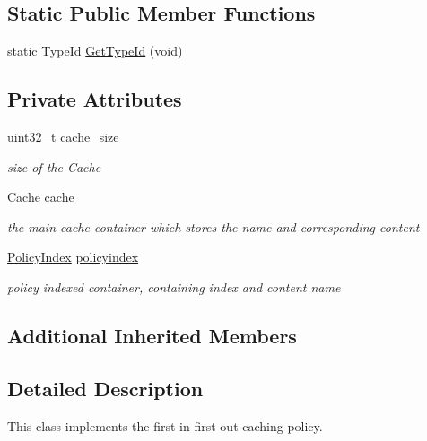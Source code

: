 \subsection*{Static Public Member Functions}
\begin{DoxyCompactItemize}
\item 
static Type\-Id \hyperlink{classns3_1_1CacheWithFifo_af0d8c81ef307fb573d5132fdb70500a6}{Get\-Type\-Id} (void)
\end{DoxyCompactItemize}
\subsection*{Private Attributes}
\begin{DoxyCompactItemize}
\item 
uint32\-\_\-t \hyperlink{classns3_1_1CacheWithFifo_a73682581680dbb344b2d39fcec84d22a}{cache\-\_\-size}
\begin{DoxyCompactList}\small\item\em size of the Cache \end{DoxyCompactList}\item 
\hyperlink{classns3_1_1NamedContentCache_a9aa35d883b9f4153d97b6e7dc74f9307}{Cache} \hyperlink{classns3_1_1CacheWithFifo_a0156478153f80ff4c9980c8ad41a5c6e}{cache}
\begin{DoxyCompactList}\small\item\em the main cache container which stores the name and corresponding content \end{DoxyCompactList}\item 
\hyperlink{classns3_1_1NamedContentCache_a0b728ea2d4e0acbe431897b2374cfc8e}{Policy\-Index} \hyperlink{classns3_1_1CacheWithFifo_a6eac664460d6029cebf941cd42097d0b}{policyindex}
\begin{DoxyCompactList}\small\item\em policy indexed container, containing index and content name \end{DoxyCompactList}\end{DoxyCompactItemize}
\subsection*{Additional Inherited Members}


\subsection{Detailed Description}
This class implements the first in first out caching policy. 

